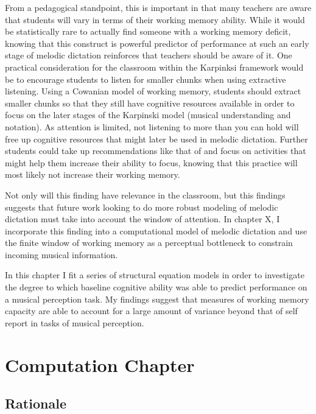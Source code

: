 \documentclass[]{book}
\begin{document}
From a pedagogical standpoint, this is important in that many teachers are aware that students will vary in terms of their working memory ability.
While it would be statistically rare to actually find someone with a working memory deficit, knowing that this construct is powerful predictor of performance at such an early stage of melodic dictation reinforces that teachers should be aware of it.
One practical consideration for the classroom within the Karpinksi framework would be to encourage students to listen for smaller chunks when using extractive listening.
Using a Cowanian model of working memory, students should extract smaller chunks so that they still have cognitive resources available in order to focus on the later stages of the Karpinski model (musical understanding and notation).
As attention is limited, not listening to more than you can hold will free up cognitive resources that might later be used in melodic dictation.
Further students could take up recommendations like that of \citet{chenetteReframingAuralSkills2019} and focus on activities that might help them increase their ability to focus, knowing that this practice will most likely not increase their working memory.

Not only will this finding have relevance in the classroom, but this findings suggests that future work looking to do more robust modeling of melodic dictation must take into account the window of attention.
In chapter X, I incorporate this finding into a computational model of melodic dictation and use the finite window of working memory as a perceptual bottleneck to constrain incoming musical information.

In this chapter I fit a series of structural equation models in order to investigate the degree to which baseline cognitive ability was able to predict performance on a musical perception task.
My findings suggest that measures of working memory capacity are able to account for a large amount of variance beyond that of self report in tasks of musical perception.

\hypertarget{computation-chapter}{%
\chapter{Computation Chapter}\label{computation-chapter}}

\hypertarget{rationale-2}{%
\section{Rationale}\label{rationale-2}}
\end{document}
